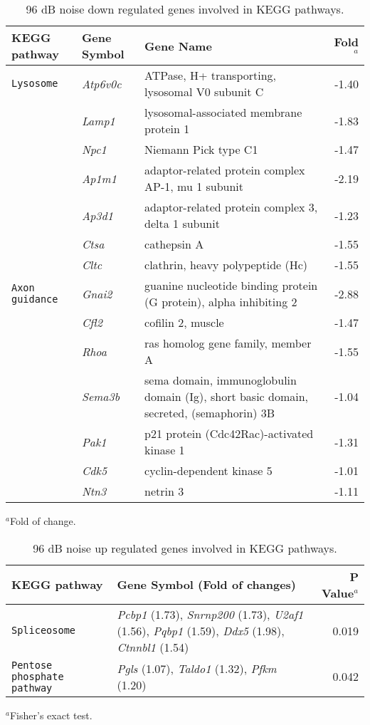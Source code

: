 \documentclass{article}
\begin{document}
\begin{table}
\caption{96 dB noise down regulated genes involved in KEGG pathways.}
\begin{small}
\begin{tabular}{l l p{2.5in} r}
\hline
KEGG pathway & Gene Symbol & Gene Name & Fold$^a$ \\
\hline
\texttt{Lysosome} & {\it Atp6v0c} &  ATPase, H+ transporting, lysosomal V0 subunit C &-1.40 \\
 & {\it Lamp1}& lysosomal-associated membrane protein 1 & -1.83\\
 & {\it Npc1}& Niemann Pick type C1 & -1.47\\
 & {\it Ap1m1}& adaptor-related protein complex AP-1, mu 1 subunit & -2.19\\
 & {\it Ap3d1}& adaptor-related protein complex 3, delta 1 subunit & -1.23 \\
 & {\it Ctsa} & cathepsin A & -1.55 \\
 & {\it Cltc} & clathrin, heavy polypeptide (Hc) & -1.55 \\
\texttt{Axon guidance} & {\it Gnai2} & guanine nucleotide binding protein (G protein), alpha inhibiting 2  & -2.88 \\
 & {\it Cfl2} &  cofilin 2, muscle & -1.47 \\
 & {\it Rhoa} & ras homolog gene family, member A  & -1.55 \\
 & {\it Sema3b} & sema domain, immunoglobulin domain (Ig), short basic domain, secreted, (semaphorin) 3B & -1.04 \\
 & {\it Pak1} & p21 protein (Cdc42\/Rac)-activated kinase 1  & -1.31 \\
 & {\it Cdk5} & cyclin-dependent kinase 5 & -1.01 \\
 & {\it Ntn3} & netrin 3  & -1.11 \\
\hline
\end{tabular}
$^a$Fold of change.
\end{small}
\label{table:tab2}
\end{table}

\begin{table}
\caption{96 dB noise up regulated genes involved in KEGG pathways.}
\begin{small}
\begin{tabular}{l p{2.7in} r}
\hline
KEGG pathway & Gene Symbol (Fold of changes) & P Value$^a$\\
\hline
\texttt{Spliceosome} & {\it Pcbp1} (1.73), {\it Snrnp200} (1.73), {\it U2af1} (1.56), {\it Pqbp1} (1.59), {\it Ddx5} (1.98), {\it Ctnnbl1} (1.54) & 0.019\\
\texttt{Pentose phosphate pathway} & {\it Pgls} (1.07), {\it Taldo1} (1.32), {\it Pfkm} (1.20)  & 0.042 \\
\hline
\end{tabular}
$^a$Fisher's exact test.
\end{small}
\label{table:tab3}
\end{table}
\end{document}
